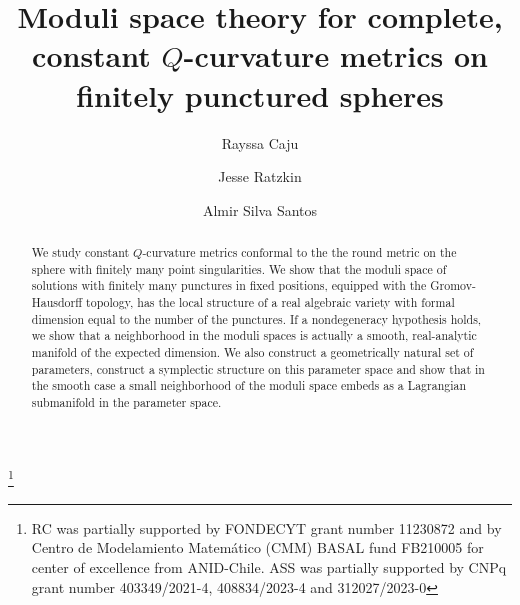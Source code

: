 \documentclass[reqno,11pt]{amsart}
\theoremstyle{tttheorem}
\begin{document}
\title[Moduli of constant $Q$-curvature metrics]{Moduli space theory for complete, 
constant $Q$-curvature metrics on finitely punctured spheres}  

\author[R. Caju]{Rayssa Caju}
\author[J. Ratzkin]{Jesse Ratzkin}
\author[A. Silva Santos]{Almir Silva Santos}

\address[R. Caju]{Department of Mathematical Engineering, University of Chile
\newline\indent 
    Beauchef 851, Edificio Norte, Santiago, Chile}


\address[J. Ratzkin]{Department of Mathematics,
	Universit\"{a}t W\"{u}rzburg
	\newline{}, W\"{u}rzburg-BA, Germany}

\address[A. Silva Santos]{Department of Mathematics, 
	Federal University of Sergipe
	\newline{}-230, Sao Cristov\~ao-SE, Brazil}

\thanks{RC was partially supported by FONDECYT grant number 11230872 and by Centro de Modelamiento Matemático (CMM) BASAL fund FB210005 for center of excellence from ANID-Chile. ASS was partially supported by CNPq grant number 403349/2021-4, 408834/2023-4 and 312027/2023-0}

\maketitle

\begin{abstract}
We study constant $Q$-curvature metrics conformal to the 
the round metric on the sphere with finitely many point singularities. We show that 
the moduli space of solutions with finitely many punctures in fixed 
positions, equipped 
with the Gromov-Hausdorff topology, has the local structure of a real algebraic variety with formal 
dimension equal to the number of the punctures. If a nondegeneracy hypothesis holds, 
we show that a neighborhood in the moduli spaces is actually a smooth, real-analytic 
manifold of the expected dimension. We also construct a geometrically natural 
set of parameters, construct a symplectic 
structure on this parameter space and show that in the smooth case 
a small neighborhood of the moduli space embeds as a Lagrangian 
submanifold in the parameter space. 
\end{abstract}
\end{document}
